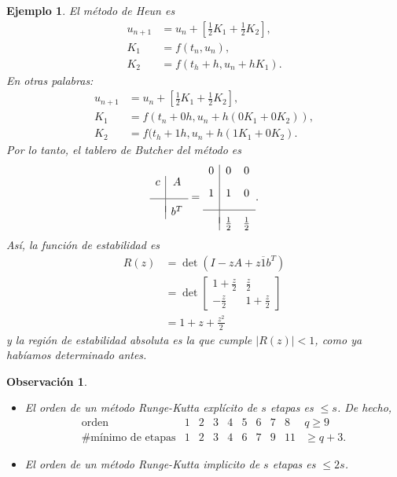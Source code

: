 \documentclass[11pt,letterpaper]{report}
\newtheorem{example}{Ejemplo}
\newtheorem{remark}{Observación}
\newcommand\ol\overline
\begin{document}
\begin{example}
  El método de Heun es
  \begin{align}
    u_{n+1} &= u_n
    + \left[ \frac{1}{2} K_1 + \frac{1}{2} K_2 \right], \\
    K_1 &= f(t_n,u_n), \\
    K_2 &= f(t_h+h,u_n+hK_1)
  .\end{align}
  En otras palabras:
  \begin{align}
    u_{n+1} &= u_n
    + \left[ \frac{1}{2} K_1 + \frac{1}{2} K_2 \right], \\
    K_1 &= f(t_n + 0 h,u_n + h(0 K_1 + 0 K_2)), \\
    K_2 &= f(t_h + 1 h,u_n+h(1 K_1 + 0 K_2)
  .\end{align}
  Por lo tanto, el tablero de Butcher del método es
  \begin{equation}
    \begin{array}{c|c}
      c & A \\[3mm]
      \hline \\[-2mm]
        & b^{T}
    \end{array}
    =
    \begin{array}{c|cc}
      0 & 0 & 0 \\[3mm]
      1 & 1 & 0 \\[3mm]
      \hline \\[-2mm]
        & \frac{1}{2} & \frac{1}{2}
    \end{array}
  .\end{equation}
  Así, la función de estabilidad es
  \begin{align}
    R(z)
    &= \det(I - zA + z\ol{1}b^{T}) \\
    &=
    \det
    \begin{bmatrix}
      1 + \frac{z}{2} & \frac{z}{2} \\
      -\frac{z}{2} & 1 + \frac{z}{2}
    \end{bmatrix}
    \\
    &= 1 + z + \frac{z^{2}}{2}
  \end{align}
  y la región de estabilidad absoluta es la que cumple $|R(z)|<1$,
  como ya habíamos determinado antes.
\end{example}

\begin{remark}\leavevmode
  \begin{itemize}
    \item
      El orden de un método Runge-Kutta explícito de $s$ etapas es
      $\leq s$. De hecho,
      \begin{equation}
        \begin{array}{c|cccccccc|c}
          \text{orden}
            & 1 & 2 & 3 & 4 & 5 & 6 & 7 & 8 & q\geq 9 \\
          \hline
          \text{\# mínimo de etapas}
            & 1 & 2 & 3 & 4 & 6 & 7 & 9 & 11 & \geq q+3.
        \end{array}
      \end{equation}
    \item
      El orden de un método Runge-Kutta implicito de $s$ etapas es
      $\leq 2s$.
  \end{itemize}
\end{remark}
\end{document}
